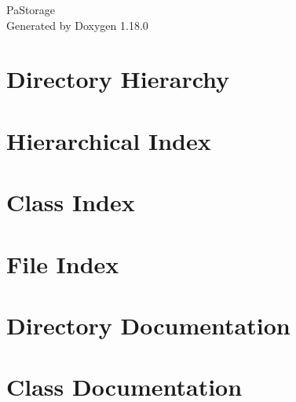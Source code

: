\documentclass[twoside]{book}
\newcommand{\+}{\discretionary{\mbox{\scriptsize$\hookleftarrow$}}{}{}}
\newcommand{\clearemptydoublepage}{%
    \newpage{\pagestyle{empty}\cleardoublepage}%
  }
\begin{document}
  \raggedbottom
    \hypersetup{pageanchor=false,
                bookmarksnumbered=true,
                pdfencoding=unicode
               }
  \begin{titlepage}
  \vspace*{7cm}
  \begin{center}%
  {\Large Pa\+Storage}\\
  \vspace*{1cm}
  {\large Generated by Doxygen 1.18.0}\\
  \end{center}
  \end{titlepage}
  \clearemptydoublepage
  \tableofcontents
  \clearemptydoublepage
  \hypersetup{pageanchor=true}

\chapter{Directory Hierarchy}

\chapter{Hierarchical Index}

\chapter{Class Index}

\chapter{File Index}

\chapter{Directory Documentation}



\chapter{Class Documentation}





\end{document}

